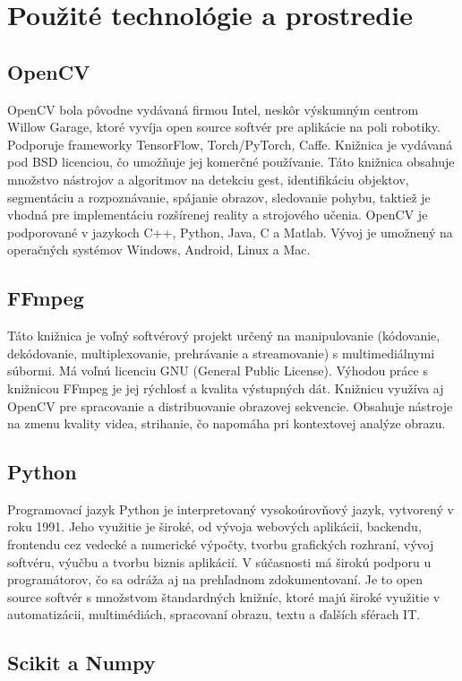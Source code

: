 \section{Použité technológie a prostredie}
\subsection{OpenCV}
\acrfull{OpenCV} bola pôvodne vydávaná firmou Intel, neskôr výskumným centrom Willow Garage, ktoré vyvíja open source softvér pre aplikácie na poli robotiky. Podporuje frameworky TensorFlow, Torch/PyTorch, Caffe. Knižnica je vydávaná pod BSD licenciou, čo umožňuje jej komerčné používanie. Táto knižnica obsahuje množstvo nástrojov a algoritmov na detekciu gest, identifikáciu objektov, segmentáciu a rozpoznávanie, spájanie obrazov, sledovanie pohybu, taktiež je vhodná pre implementáciu rozšírenej reality a strojového učenia. OpenCV je podporované v jazykoch C++, Python, Java, C a Matlab. Vývoj je umožnený na operačných systémov Windows, Android, Linux a Mac. \cite{c4}


\subsection{FFmpeg}
Táto knižnica je voľný softvérový projekt určený na manipulovanie (kódovanie, dekódovanie, multiplexovanie, prehrávanie a streamovanie) s multimediálnymi súbormi. Má voľnú licenciu GNU (General Public License). Výhodou práce s knižnicou FFmpeg je jej rýchlosť a kvalita výstupných dát. Knižnicu využíva aj OpenCV pre spracovanie a distribuovanie obrazovej sekvencie. Obsahuje nástroje na zmenu kvality videa, strihanie, čo napomáha pri kontextovej analýze obrazu.\cite{c9}

\subsection{Python}
Programovací jazyk Python je interpretovaný vysokoúrovňový jazyk, vytvorený v roku 1991. Jeho využitie je široké, od vývoja webových aplikácii, backendu, frontendu cez vedecké a numerické výpočty, tvorbu grafických rozhraní, vývoj softvéru, výučbu a tvorbu biznis aplikácií. V súčasnosti má širokú podporu u programátorov, čo sa odráža aj na prehľadnom zdokumentovaní. Je to open source softvér s množstvom štandardných knižníc, ktoré majú široké využitie v automatizácii, multimédiách, spracovaní obrazu, textu a ďalších sférach IT.\cite{c6}
\subsection{Scikit a Numpy}

